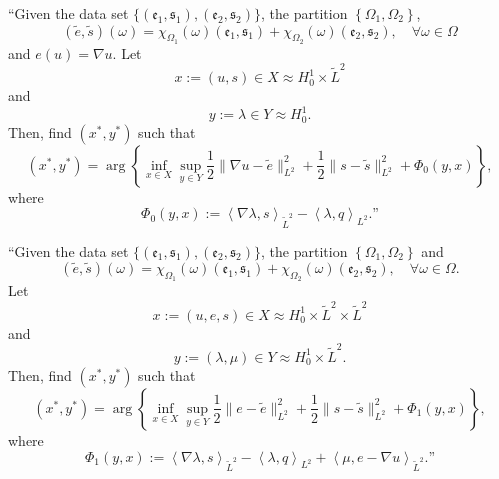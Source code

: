 \begin{problem}[QPLC0]
\hspace{-2mm}
``Given the data set $\{\!(\mathfrak{e}_1,\!\mathfrak{s}_1),\!(\mathfrak{e}_2,\!\mathfrak{s}_2)\!\}$,
the partition $\left\{\Omega_1, \Omega_2 \right\}$,
\begin{equation}
    (\tilde{e},\tilde{s})(\omega) =
    \chi_{\Omega_1}(\omega) (\mathfrak{e}_1,\mathfrak{s}_1)+
    \chi_{\Omega_2}(\omega) (\mathfrak{e}_2,\mathfrak{s}_2),
    \quad \forall \omega \in \Omega
\end{equation}
and $e(u) = \nabla u$.
Let 
\begin{equation}
x := 
(u, s)
\in X \approx H^1_0 \times \tilde{L}^2
\end{equation}
and
\begin{equation}
y :=
\lambda
\in Y \approx H^1_0.
\end{equation}
Then, find $(x^*, y^*)$ such that
\begin{equation}
(x^*, y^*) =
\arg
\left\{
\inf_{x \in X}
\sup_{y \in Y}
\frac12\|\nabla u -\tilde{e}\|^2_{L^2}+
\frac12\|s-\tilde{s}\|^2_{L^2}+
\Phi_0(y,x)
\right\},
\end{equation}
where
\begin{equation}
    \Phi_0(y,x) := 
    \left\langle \nabla \lambda, s \right\rangle_{\tilde{L}^2}-
\left\langle \lambda, q \right\rangle_{L^2}.\textrm{''}
\end{equation}
\end{problem}

\begin{problem}[QPLC1]
\hspace{-2mm}``Given the data set $\{\!(\mathfrak{e}_1,\!\mathfrak{s}_1),\!(\mathfrak{e}_2,\!\mathfrak{s}_2)\!\}$, the partition $\left\{\Omega_1, \Omega_2 \right\}$ and
\begin{equation}
    (\tilde{e},\tilde{s})(\omega) =
    \chi_{\Omega_1}(\omega) (\mathfrak{e}_1,\mathfrak{s}_1)+
    \chi_{\Omega_2}(\omega) (\mathfrak{e}_2,\mathfrak{s}_2),
    \quad \forall \omega \in \Omega.
\end{equation}
Let 
\begin{equation}
x := 
(u, e, s)
\in X \approx H^1_0 \times \tilde{L}^2 \times \tilde{L}^2
\end{equation}
and
\begin{equation}
y :=
(\lambda, \mu)
\in Y \approx H^1_0 \times \tilde{L}^2.
\end{equation}
Then, find $(x^*, y^*)$ such that
\begin{equation}
(x^*, y^*) =
\arg
\left\{
\inf_{x \in X}
\sup_{y \in Y}
\frac12\|e -\tilde{e}\|^2_{L^2}+
\frac12\|s-\tilde{s}\|^2_{L^2}+
\Phi_1(y,x)
\right\},
\end{equation}
where
\begin{equation}
    \Phi_1(y,x) := 
    \left\langle \nabla \lambda, s \right\rangle_{\tilde{L}^2}-
    \left\langle \lambda, q \right\rangle_{L^2}+
    \left\langle \mu, e - \nabla u \right\rangle_{\tilde{L}^2}.\textrm{''}
\end{equation}
\end{problem}

